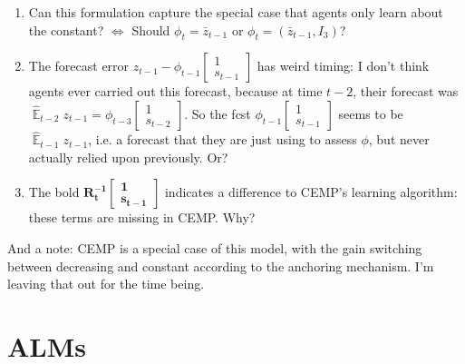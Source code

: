 \documentclass[11pt]{article}
\renewcommand{\[}{\begin{equation}}
\renewcommand{\]}{\end{equation}}
\DeclareMathOperator{\E}{\mathbb{E}}
\begin{document}
\begin{enumerate}
\item Can this formulation capture the special case that agents only learn about the constant? $\Leftrightarrow$ Should $\phi_t = \bar{z}_{t-1}$ or $\phi_t = (\bar{z}_{t-1}, I_3)$?
\item The forecast error $z_{t-1} - \phi_{t-1} \begin{bmatrix} 1 \\ s_{t-1} \end{bmatrix} $ has weird timing: I don't think agents ever carried out this forecast, because at time $t-2$, their forecast was $\hat{\E}_{t-2}z_{t-1}=\phi_{t-3}\begin{bmatrix} 1 \\ s_{t-2} \end{bmatrix}$. So the fcst $\phi_{t-1} \begin{bmatrix} 1 \\ s_{t-1} \end{bmatrix} $  seems to be $\hat{\E}_{t-1}z_{t-1}$, i.e. a forecast that they are just using to assess $\phi$, but never actually relied upon previously. Or?
\item The bold $\mathbf{R_t^{-1}}\begin{bmatrix} \mathbf{1} \\ \mathbf{s_{t-1}} \end{bmatrix}$ indicates a difference to CEMP's learning algorithm: these terms are missing in CEMP. Why?
\end{enumerate}
And a note: CEMP is a special case of this model, with the gain switching between decreasing and constant according to the anchoring mechanism. I'm leaving that out for the time being. 

\section{ALMs}
\end{document}
